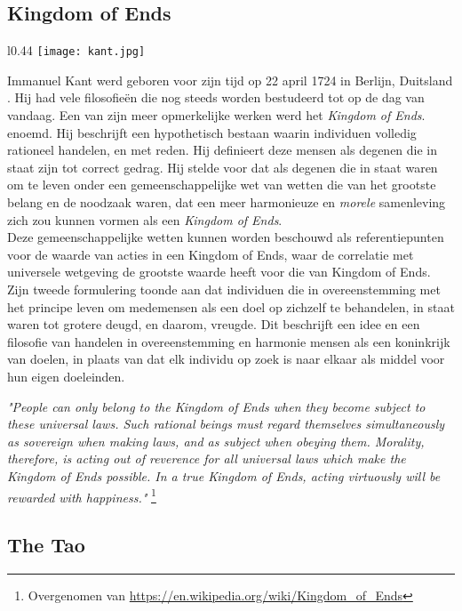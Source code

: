 \documentclass[11pt]{article}
\begin{document}
\pagebreak
\subsection{Kingdom of Ends}

\begin{wrapfigure}{l}{0.44\textwidth}
    \centering
    \texttt{[image: kant.jpg]}
\end{wrapfigure}

Immanuel Kant werd geboren voor zijn tijd op 22 april 1724 in Berlijn, Duitsland \cite{kant}. Hij had vele filosofieën die nog steeds worden bestudeerd tot op de dag van vandaag. Een van zijn meer opmerkelijke werken werd het \textit{Kingdom of Ends}. 
enoemd. Hij beschrijft een hypothetisch bestaan ​​waarin individuen volledig rationeel handelen, en met reden. Hij definieert deze mensen als degenen die in staat zijn tot correct gedrag. Hij stelde voor dat als degenen die in staat waren om te leven onder een gemeenschappelijke wet van wetten die van het grootste belang en de noodzaak waren, dat een meer harmonieuze en \textit{morele} samenleving zich zou kunnen vormen als een \textit{Kingdom of Ends}.\\

\noindent Deze gemeenschappelijke wetten kunnen worden beschouwd als referentiepunten voor de waarde van acties in een Kingdom of Ends, waar de correlatie met universele wetgeving de grootste waarde heeft voor die van Kingdom of Ends. Zijn tweede formulering toonde aan dat individuen die in overeenstemming met het principe leven om medemensen als een doel op zichzelf te behandelen, in staat waren tot grotere deugd, en daarom, vreugde. Dit beschrijft een idee en een filosofie van handelen in overeenstemming en harmonie mensen als een koninkrijk van doelen, in plaats van dat elk individu op zoek is naar elkaar als middel voor hun eigen doeleinden.

\bigskip
\textit{"People can only belong to the Kingdom of Ends when they become subject to these universal laws. Such rational beings must regard themselves simultaneously as sovereign when making laws, and as subject when obeying them. Morality,  therefore, is acting out of reverence for all universal laws which make the Kingdom of Ends  possible. In a true Kingdom of Ends, acting virtuously will be rewarded with happiness."} \footnote{Overgenomen van \url{https://en.wikipedia.org/wiki/Kingdom_of_Ends}}

\subsection{The Tao}
\end{document}
